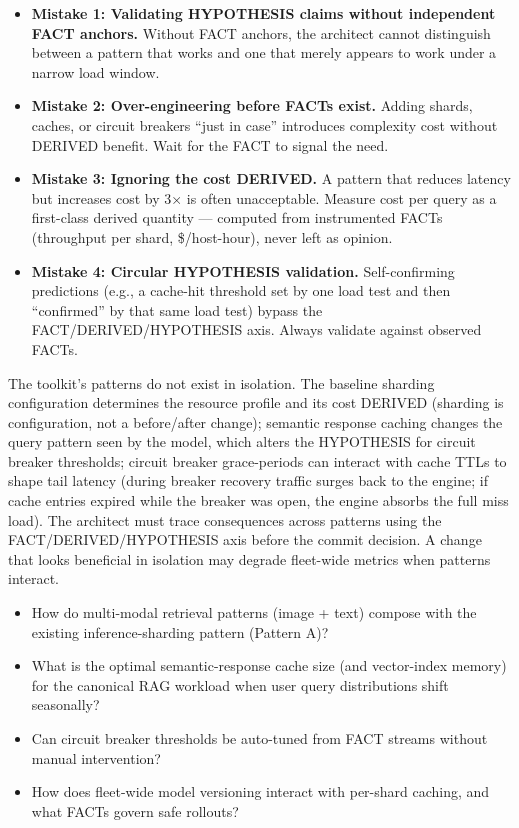 \label{common-mistakes}


\begin{itemize}
\tightlist
\item
  \textbf{Mistake 1: Validating HYPOTHESIS claims without independent
  FACT anchors.} Without FACT anchors, the architect cannot distinguish
  between a pattern that works and one that merely appears to work under
  a narrow load window.
\item
  \textbf{Mistake 2: Over-engineering before FACTs exist.} Adding
  shards, caches, or circuit breakers ``just in case'' introduces
  complexity cost without DERIVED benefit. Wait for the FACT to signal
  the need.
\item
  \textbf{Mistake 3: Ignoring the cost DERIVED.} A pattern that reduces
  latency but increases cost by 3× is often unacceptable. Measure cost
  per query as a first-class derived quantity --- computed from
  instrumented FACTs (throughput per shard, \$/host-hour), never left as
  opinion.
\item
  \textbf{Mistake 4: Circular HYPOTHESIS validation.} Self-confirming
  predictions (e.g., a cache-hit threshold set by one load test and then
  ``confirmed'' by that same load test) bypass the
  FACT/DERIVED/HYPOTHESIS axis. Always validate against observed FACTs.
\end{itemize}

\label{architecture-consequence}


The toolkit's patterns do not exist in isolation. The baseline sharding
configuration determines the resource profile and its cost DERIVED
(sharding is configuration, not a before/after change); semantic
response caching changes the query pattern seen by the model, which
alters the HYPOTHESIS for circuit breaker thresholds; circuit breaker
grace-periods can interact with cache TTLs to shape tail latency (during
breaker recovery traffic surges back to the engine; if cache entries
expired while the breaker was open, the engine absorbs the full miss
load). The architect must trace consequences across patterns using the
FACT/DERIVED/HYPOTHESIS axis before the commit decision. A change that
looks beneficial in isolation may degrade fleet-wide metrics when
patterns interact.

\label{what-we-still-dont-know}


\begin{itemize}
\tightlist
\item
  How do multi-modal retrieval patterns (image + text) compose with the
  existing inference-sharding pattern (Pattern A)?
\item
  What is the optimal semantic-response cache size (and vector-index
  memory) for the canonical RAG workload when user query distributions
  shift seasonally?
\item
  Can circuit breaker thresholds be auto-tuned from FACT streams without
  manual intervention?
\item
  How does fleet-wide model versioning interact with per-shard caching,
  and what FACTs govern safe rollouts?
\end{itemize}

